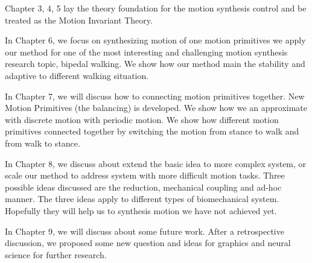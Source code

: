 Chapter 3, 4, 5 lay the theory foundation for the motion synthesis control and be treated as the Motion Invariant Theory.

In Chapter 6, we focus on synthesizing motion of one motion primitives
 we apply our method for one of the most interesting and challenging motion synthesis research topic, bipedal walking. We show how our method main the stability and adaptive to different walking situation.


In Chapter 7, we will discuss how to connecting motion primitives together.
New Motion Primitives (the balancing) is developed. We show how we an approximate with discrete motion with periodic motion. We show how different motion primitives connected together by switching the motion from stance to walk and from walk to stance.

In Chapter 8, we discuss about extend the basic idea to more complex system, or scale our method to address system with more difficult motion tasks. Three possible ideas discussed are the reduction, mechanical coupling and ad-hoc manner. The three ideas apply to different types of biomechanical system.
Hopefully they will help us to synthesis motion we have not achieved yet.

In Chapter 9, we will discuss about some future work. After a retrospective discussion, we proposed some new question and ideas for graphics and neural science for further research.







